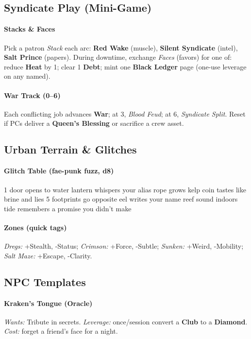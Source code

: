 \subsection*{Syndicate Play (Mini-Game)}

\paragraph{Stacks \& Faces}
Pick a patron \emph{Stack} each arc: \textbf{Red Wake} (muscle), \textbf{Silent Syndicate} (intel), \textbf{Salt Prince} (papers).  
During downtime, exchange \emph{Faces} (favors) for one of: reduce \textbf{Heat} by 1; clear 1 \textbf{Debt}; mint one \textbf{Black Ledger} page (one-use leverage on any named).

\paragraph{War Track (0--6)}
Each conflicting job advances \textbf{War}; at 3, \emph{Blood Feud}; at 6, \emph{Syndicate Split}. Reset if PCs deliver a \textbf{Queen’s Blessing} or sacrifice a crew asset.

\subsection*{Urban Terrain \& Glitches}

\paragraph{Glitch Table (fae-punk fuzz, d8)}
1 door opens to water  lantern whispers your alias  rope grows kelp  coin tastes like brine and lies  
5 footprints go opposite  eel writes your name  reef sound indoors  tide remembers a promise you didn’t make

\paragraph{Zones (quick tags)}
\emph{Dregs:} +Stealth, -Status; \emph{Crimson:} +Force, -Subtle; \emph{Sunken:} +Weird, -Mobility; \emph{Salt Maze:} +Escape, -Clarity.

\subsection*{NPC Templates}

\paragraph{Kraken’s Tongue (Oracle)}
\emph{Wants:} Tribute in secrets. \quad \emph{Leverage:} once/session convert a \textbf{Club} to a \textbf{Diamond}. \quad \emph{Cost:} forget a friend’s face for a night.

